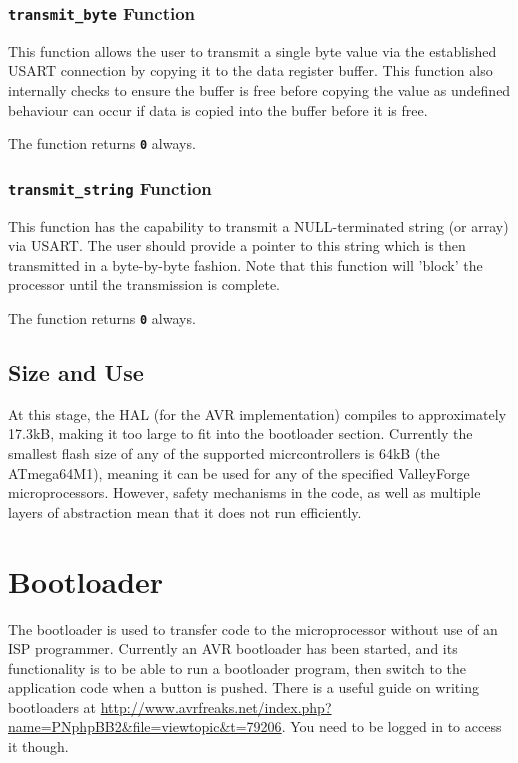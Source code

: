 \documentclass[a4paper, oneside, 11pt, titlepage, onecolumn, openright]{report}
\begin{document}
{{\subsection{\textbf{\texttt{transmit\_byte}} Function}
			\label{ss:HALusarttransmit_byteFunction}
			
			This function allows the user to transmit a single byte value via the established USART connection by copying it to the data register buffer. This function also internally checks to ensure the buffer is free before copying the value as undefined behaviour can occur if data is copied into the buffer before it is free.
			
			The function returns \textbf{\texttt{0}} always.
			
\subsection{\textbf{\texttt{transmit\_string}} Function}
			\label{ss:HALusarttransmit_stringFunction}
			
			This function has the capability to transmit a NULL-terminated string (or array) via USART. The user should provide a pointer to this string which is then transmitted in a byte-by-byte fashion. Note that this function will 'block' the processor until the transmission is complete.
			
			The function returns \textbf{\texttt{0}} always.			
			
			
			
\section{Size and Use}
			\label{s:HALSizeAndUse}
			At this stage, the HAL (for the AVR implementation) compiles to approximately 17.3kB, making it too large to fit into the bootloader section. Currently the smallest flash size of any of the supported micrcontrollers is 64kB (the ATmega64M1), meaning it can be used for any of the specified ValleyForge microprocessors. However, safety mechanisms in the code, as well as multiple layers of abstraction mean that it does not run efficiently.	
						
\chapter{Bootloader}
			\label{C:Bootloader}
			The bootloader is used to transfer code to the microprocessor without use of an ISP programmer. Currently an AVR bootloader has been started, and its functionality is to be able to run a bootloader program, then switch to the application code when a button is pushed.
			There is a useful guide on writing bootloaders at \url{http://www.avrfreaks.net/index.php?name=PNphpBB2&file=viewtopic&t=79206}. You need to be logged in to access it though.			 
}}
\end{document}
